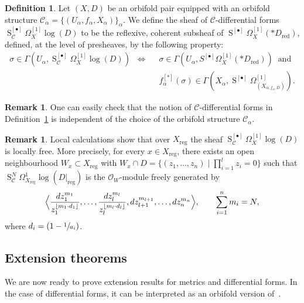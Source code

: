 \documentclass[JEP,XML,SOM,Unicode]{cedram}
\let\mathcal\mathscr
\let\scr\mathscr
\let\oldbullet\bullet
\newcommand{\sbullet}{{\scriptscriptstyle\oldbullet}}
\let\bullet\sbullet
\theoremstyle{plain}
\theoremstyle{definition}
\newtheorem{definition}[theorem]{Definition}
\newtheorem{remark}[theorem]{Remark}
\numberwithin{equation}{theorem}
\DeclareMathOperator{\red}{red}
\DeclareMathOperator{\reg}{reg}
\DeclareMathOperator{\Sym}{S}
\newcommand{\sO}{\scr{O}}
\begin{document}
\begin{definition}
\label{def:CDiff}
Let $(X,D)$ be an orbifold pair equipped with an orbifold structure
$\mathcal C_{\alpha} = \{ (U_{\alpha}, f_{\alpha}, X_{\alpha}) \}_{\alpha}$.
We define the sheaf of $\mathcal C$-differential forms $\Sym^{[\bullet]}_{\mathcal C} \Omega^{[1]}_X\log (D)$
to be the reflexive, coherent subsheaf of $\Sym^{[\bullet]} \Omega^{[1]}_X(*D_{\red})$, defined, at the level of
presheaves, by the following property:
\begin{align*}
\sigma \in \Gamma (U_{\alpha}, \Sym^{[\bullet]}_{\mathcal C} \Omega^{[1]}_X\log (D)) \; \; \Longleftrightarrow \;\;&
\sigma \in \Gamma(U_{\alpha}, S^{[\bullet]} \Omega^{[1]}_X(* D_{\red}) ) \; \; \text{and} \\
&f^{[*]}_{\alpha}(\sigma) \in \Gamma (X_{\alpha}, \Sym^{[\bullet]} \Omega^{[1]}_{(X_{\alpha, f_{\alpha}, D})} ).
\end{align*}
\end{definition}

\begin{remark}
One can easily check that the notion of $\mathcal C$-differential forms in Definition~\ref{def:CDiff}
is independent of the choice of the orbifold structure $\mathcal C_{\alpha}$.
\end{remark}

\begin{remark}
Local calculations show that over $X_{\reg}$ the sheaf $\Sym_{\mathcal C}^{[\bullet]}\Omega^{[1]}_{X}\log(D)$
is locally free. More precisely, for every $x\in X_{\reg}$, there
exists an open neighbourhood $W_x\subset X_{\reg}$ with $W_x\cap D = \{ (z_1, \ldots, z_n) \mid \prod_{i=1}^l z_i =0 \}$
such that $\Sym^N_{\mathcal C}\Omega^1_{X_{\reg}}\log (D|_{\reg})$ is the $\sO_W$-module
freely generated by
$$
\Bigl\langle \frac{dz_1^{m_1}}{z_1^{\lfloor m_1\cdot d_1 \rfloor}}, \ldots, \frac{dz_l^{m_l}}{z_l^{\lfloor m_l\cdot d_l \rfloor}},
dz_{l+1}^{m_{l+1}}, \ldots, dz_n^{m_n} \Bigr\rangle, \qquad\sum_{i=1}^n m_i = N,
$$
where $d_i= (1-\sfrac{1}{a_i})$.
\end{remark}

\subsection{Extension theorems}
We are now ready to prove extension results for metrics and differential forms.
In the case of differential forms, it can be interpreted as an
orbifold version of~\cite[Prop.\,3.1]{GKK08}.
\end{document}
